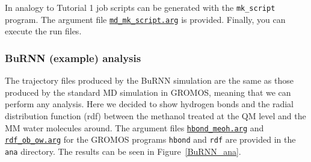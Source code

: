 In analogy to Tutorial 1 job scripts can be generated with the \texttt{mk\_script} program. The argument file \href{https://github.com/LierB/gromos_tutorial_livecoms/blob/burnn_tutorial_rc/tutorial_files/t_06/md_burnn/md_mk_script.arg}{\texttt{md\_mk\_script.arg}} is provided. Finally, you can execute the run files.


\subsubsection{BuRNN (example) analysis}
The trajectory files produced by the BuRNN simulation are the same as those produced by the standard MD simulation in GROMOS, meaning that we can perform any analysis. Here we decided to show hydrogen bonds and the radial distribution function (rdf) between the methanol treated at the QM level and the MM water molecules around. The argument files \href{https://github.com/LierB/gromos_tutorial_livecoms/blob/burnn_tutorial_rc/tutorial_files/t_06/md_burnn/ana/hbond/hbond_meoh.arg}{\texttt{hbond\_meoh.arg}} and \href{https://github.com/LierB/gromos_tutorial_livecoms/blob/burnn_tutorial_rc/tutorial_files/t_06/md_burnn/ana/rdf/rdf_ob_ow.arg}{\texttt{rdf\_ob\_ow.arg}} for the GROMOS programs \texttt{hbond} and \texttt{rdf} are provided in the \texttt{ana} directory. 
The results can be seen in Figure~\ref{BuRNN_ana}.

